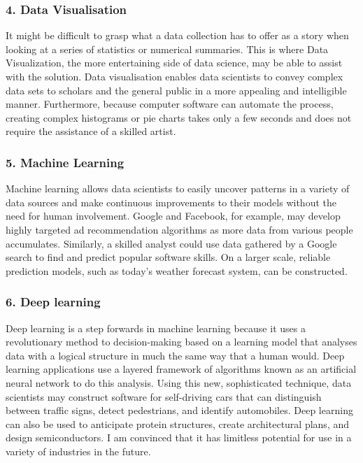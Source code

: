 \documentclass[a4paper, 11pt]{report}
\begin{document}
    \subsubsection{4. Data Visualisation}
    It might be difficult to grasp what a data collection has to offer as a story when looking at a series of statistics or numerical summaries. This is where Data Visualization, the more entertaining side of data science, may be able to assist with the solution. Data visualisation enables data scientists to convey complex data sets to scholars and the general public in a more appealing and intelligible manner.\cite{isaac1} Furthermore, because computer software can automate the process, creating complex histograms or pie charts takes only a few seconds and does not require the assistance of a skilled artist.\cite{isaac1}

    \subsubsection{5. Machine Learning}
    Machine learning allows data scientists to easily uncover patterns in a variety of data sources and make continuous improvements to their models without the need for human involvement.\cite{isaac5} Google and Facebook, for example, may develop highly targeted ad recommendation algorithms as more data from various people accumulates. Similarly, a skilled analyst could use data gathered by a Google search to find and predict popular software skills. On a larger scale, reliable prediction models, such as today's weather forecast system, can be constructed.\cite{isaac1}

    \subsubsection{6. Deep learning}
    Deep learning is a step forwards in machine learning because it uses a revolutionary method to decision-making based on a learning model that analyses data with a logical structure in much the same way that a human would.\cite{isaac5} Deep learning applications use a layered framework of algorithms known as an artificial neural network to do this analysis.\cite{isaac5} Using this new, sophisticated technique, data scientists may construct software for self-driving cars that can distinguish between traffic signs, detect pedestrians, and identify automobiles. \cite{isaac1} Deep learning can also be used to anticipate protein structures, create architectural plans, and design semiconductors. I am convinced that it has limitless potential for use in a variety of industries in the future.
\end{document}
